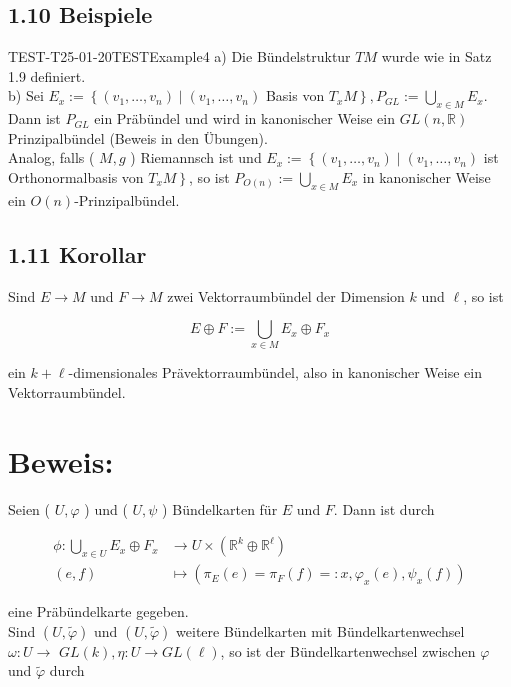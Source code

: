 \subsection*{1.10 Beispiele}
\begin{EXA}{TEST-T25-01-20}{TESTExample4}
a) Die Bündelstruktur $T M$ wurde wie in Satz 1.9 definiert.\\
b) Sei $E_{x}:=\left\{\left(v_{1}, \ldots, v_{n}\right) \mid\left(v_{1}, \ldots, v_{n}\right)\right.$ Basis von $\left.T_{x} M\right\}, P_{G L}:=\bigcup_{x \in M} E_{x}$. Dann ist $P_{G L}$ ein Präbündel und wird in kanonischer Weise ein $G L(n, \mathbb{R})$ Prinzipalbündel (Beweis in den Übungen).\\
Analog, falls ( $M, g$ ) Riemannsch ist und $E_{x}:=\left\{\left(v_{1}, \ldots, v_{n}\right) \mid\left(v_{1}, \ldots, v_{n}\right)\right.$ ist Orthonormalbasis von $\left.T_{x} M\right\}$, so ist $P_{O(n)}:=\bigcup_{x \in M} E_{x}$ in kanonischer Weise ein $O(n)$-Prinzipalbündel.
\end{EXA}

\subsection*{1.11 Korollar}
Sind $E \rightarrow M$ und $F \rightarrow M$ zwei Vektorraumbündel der Dimension $k$ und $\ell$, so ist

$$
E \oplus F:=\bigcup_{x \in M} E_{x} \oplus F_{x}
$$

ein $k+\ell$-dimensionales Prävektorraumbündel, also in kanonischer Weise ein Vektorraumbündel.


\section*{Beweis:}
Seien ( $U, \varphi$ ) und ( $U, \psi$ ) Bündelkarten für $E$ und $F$. Dann ist durch

$$
\begin{aligned}
\phi: \bigcup_{x \in U} E_{x} \oplus F_{x} & \rightarrow U \times\left(\mathbb{R}^{k} \oplus \mathbb{R}^{\ell}\right) \\
(e, f) & \mapsto\left(\pi_{E}(e)=\pi_{F}(f)=: x, \varphi_{x}(e), \psi_{x}(f)\right)
\end{aligned}
$$

eine Präbündelkarte gegeben.\\
Sind $(U, \tilde{\varphi})$ und $(U, \tilde{\varphi})$ weitere Bündelkarten mit Bündelkartenwechsel $\omega: U \rightarrow$ $G L(k), \eta: U \rightarrow G L(\ell)$, so ist der Bündelkartenwechsel zwischen $\varphi$ und $\tilde{\varphi}$ durch

